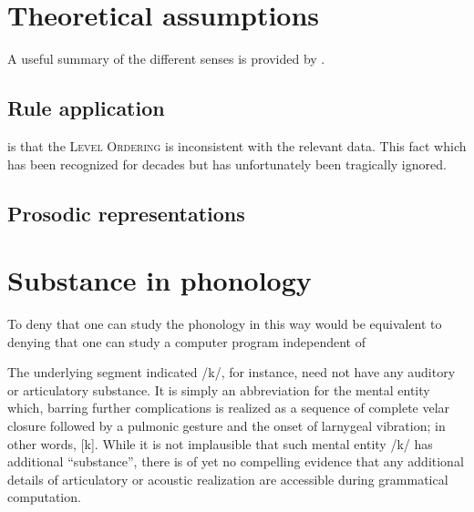 \section{Theoretical assumptions}

\citet{SPE}
\citet{Halle1993}

A useful summary of the different senses is provided by \citet[chap.~1]{Blaho2008}.
\subsection{Rule application}

is that the
\textsc{Level Ordering} \citep{Siegel1974} is inconsistent with the relevant data. This fact which has been recognized for decades \citep{Aronoff1976} but has unfortunately been tragically ignored.

\subsection{Prosodic representations}

\section{Substance in phonology}

To deny that one can study the phonology in this way would be equivalent to denying that one can study a computer program independent of

The underlying segment indicated /k/, for instance, need not have any auditory or articulatory substance. 
It is simply an abbreviation for the mental entity which, barring further complications is realized as a sequence of complete velar closure followed by a pulmonic gesture and the onset of larnygeal vibration; in other words, [k].
While it is not implausible that such mental entity /k/ has additional ``substance'', there is of yet no compelling evidence that any additional details of articulatory or acoustic realization are accessible during grammatical computation.


